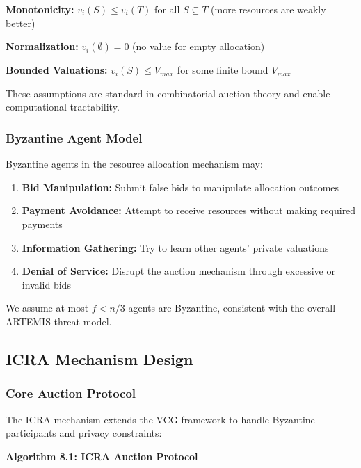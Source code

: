 \documentclass[conference]{IEEEtran}
\begin{document}
\textbf{Monotonicity:} $v_i(S) \leq v_i(T)$ for all $S \subseteq T$ (more resources are weakly better)

\textbf{Normalization:} $v_i(\emptyset) = 0$ (no value for empty allocation)

\textbf{Bounded Valuations:} $v_i(S) \leq V_{max}$ for some finite bound $V_{max}$

These assumptions are standard in combinatorial auction theory and enable computational tractability.

\subsubsection{Byzantine Agent Model}

Byzantine agents in the resource allocation mechanism may:

\begin{enumerate}
    \item \textbf{Bid Manipulation:} Submit false bids to manipulate allocation outcomes
    \item \textbf{Payment Avoidance:} Attempt to receive resources without making required payments
    \item \textbf{Information Gathering:} Try to learn other agents' private valuations
    \item \textbf{Denial of Service:} Disrupt the auction mechanism through excessive or invalid bids
\end{enumerate}

We assume at most $f < n/3$ agents are Byzantine, consistent with the overall ARTEMIS threat model.

\subsection{ICRA Mechanism Design}

\subsubsection{Core Auction Protocol}

The ICRA mechanism extends the VCG framework to handle Byzantine participants and privacy constraints:

\textbf{Algorithm 8.1: ICRA Auction Protocol}
\end{document}
